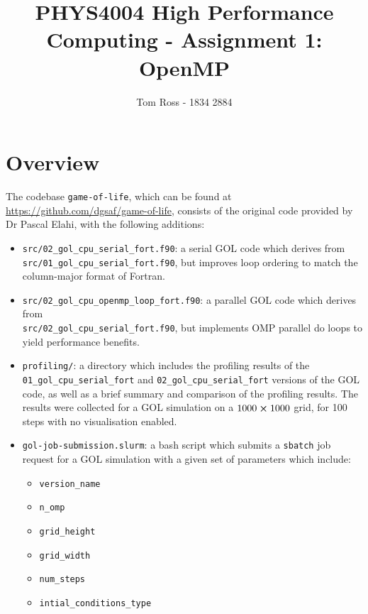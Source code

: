 \documentclass[draft]{article}
\title{PHYS4004 High Performance Computing - Assignment 1: OpenMP}
\author{Tom Ross - 1834 2884}
\date{}
\begin{document}
\section{Overview}
\label{sec:Overview}

The codebase \lstinline{game-of-life}, which can be found at
\url{https://github.com/dgsaf/game-of-life}, consists of the original code
provided by Dr Pascal Elahi, with the following additions:
\begin{itemize}
\item \lstinline{src/02_gol_cpu_serial_fort.f90}: a serial GOL code which
  derives from \\ \lstinline{src/01_gol_cpu_serial_fort.f90}, but improves loop
  ordering to match the column-major format of Fortran.

\item \lstinline{src/02_gol_cpu_openmp_loop_fort.f90}: a parallel GOL code which
  derives from \\ \lstinline{src/02_gol_cpu_serial_fort.f90}, but implements OMP
  parallel do loops to yield performance benefits.

\item \lstinline{profiling/}: a directory which includes the profiling results
  of the \\ \lstinline{01_gol_cpu_serial_fort} and
  \lstinline{02_gol_cpu_serial_fort} versions of the GOL code, as well as a
  brief summary and comparison of the profiling results.
  The results were collected for a GOL simulation on a $1000\cross1000$ grid,
  for 100 steps with no visualisation enabled.

\item \lstinline{gol-job-submission.slurm}: a bash script which submits a
  \lstinline{sbatch} job request for a GOL simulation with a given set of
  parameters which include:
  \begin{itemize}
  \item \lstinline{version_name}

  \item \lstinline{n_omp}

  \item \lstinline{grid_height}

  \item \lstinline{grid_width}

  \item \lstinline{num_steps}

  \item \lstinline{intial_conditions_type}


\end{itemize}
\end{itemize}
\end{document}
